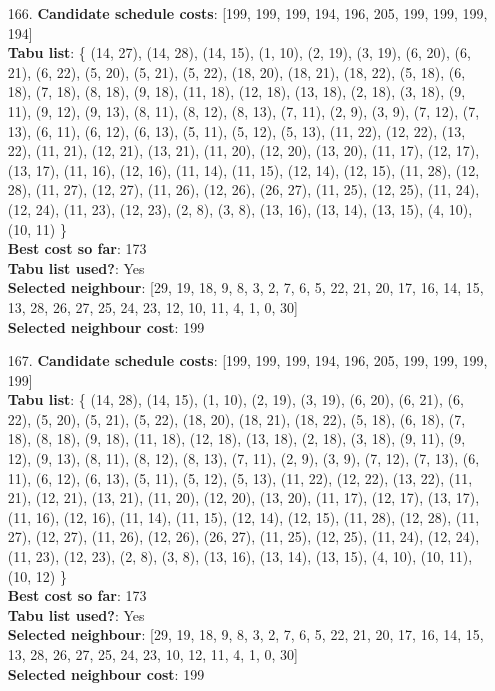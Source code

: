 \documentclass[fleqn]{article}
\begin{document}
\begin{itemize}
    \item[166.] \textbf{Candidate schedule costs}: [199, 199, 199, 194, 196, 205, 199, 199, 199, 194] \\
    \textbf{Tabu list}: \{ (14, 27), (14, 28), (14, 15), (1, 10), (2, 19), (3, 19), (6, 20), (6, 21), (6, 22), (5, 20), (5, 21), (5, 22), (18, 20), (18, 21), (18, 22), (5, 18), (6, 18), (7, 18), (8, 18), (9, 18), (11, 18), (12, 18), (13, 18), (2, 18), (3, 18), (9, 11), (9, 12), (9, 13), (8, 11), (8, 12), (8, 13), (7, 11), (2, 9), (3, 9), (7, 12), (7, 13), (6, 11), (6, 12), (6, 13), (5, 11), (5, 12), (5, 13), (11, 22), (12, 22), (13, 22), (11, 21), (12, 21), (13, 21), (11, 20), (12, 20), (13, 20), (11, 17), (12, 17), (13, 17), (11, 16), (12, 16), (11, 14), (11, 15), (12, 14), (12, 15), (11, 28), (12, 28), (11, 27), (12, 27), (11, 26), (12, 26), (26, 27), (11, 25), (12, 25), (11, 24), (12, 24), (11, 23), (12, 23), (2, 8), (3, 8), (13, 16), (13, 14), (13, 15), (4, 10), (10, 11) \} \\
    \textbf{Best cost so far}: 173 \\
    \textbf{Tabu list used?}: Yes \\
    \textbf{Selected neighbour}: [29, 19, 18, 9, 8, 3, 2, 7, 6, 5, 22, 21, 20, 17, 16, 14, 15, 13, 28, 26, 27, 25, 24, 23, 12, 10, 11, 4, 1, 0, 30] \\
    \textbf{Selected neighbour cost}: 199
      

    \item[167.] \textbf{Candidate schedule costs}: [199, 199, 199, 194, 196, 205, 199, 199, 199, 199] \\
    \textbf{Tabu list}: \{ (14, 28), (14, 15), (1, 10), (2, 19), (3, 19), (6, 20), (6, 21), (6, 22), (5, 20), (5, 21), (5, 22), (18, 20), (18, 21), (18, 22), (5, 18), (6, 18), (7, 18), (8, 18), (9, 18), (11, 18), (12, 18), (13, 18), (2, 18), (3, 18), (9, 11), (9, 12), (9, 13), (8, 11), (8, 12), (8, 13), (7, 11), (2, 9), (3, 9), (7, 12), (7, 13), (6, 11), (6, 12), (6, 13), (5, 11), (5, 12), (5, 13), (11, 22), (12, 22), (13, 22), (11, 21), (12, 21), (13, 21), (11, 20), (12, 20), (13, 20), (11, 17), (12, 17), (13, 17), (11, 16), (12, 16), (11, 14), (11, 15), (12, 14), (12, 15), (11, 28), (12, 28), (11, 27), (12, 27), (11, 26), (12, 26), (26, 27), (11, 25), (12, 25), (11, 24), (12, 24), (11, 23), (12, 23), (2, 8), (3, 8), (13, 16), (13, 14), (13, 15), (4, 10), (10, 11), (10, 12) \} \\
    \textbf{Best cost so far}: 173 \\
    \textbf{Tabu list used?}: Yes \\
    \textbf{Selected neighbour}: [29, 19, 18, 9, 8, 3, 2, 7, 6, 5, 22, 21, 20, 17, 16, 14, 15, 13, 28, 26, 27, 25, 24, 23, 10, 12, 11, 4, 1, 0, 30] \\
    \textbf{Selected neighbour cost}: 199
      


\end{itemize}
\end{document}

